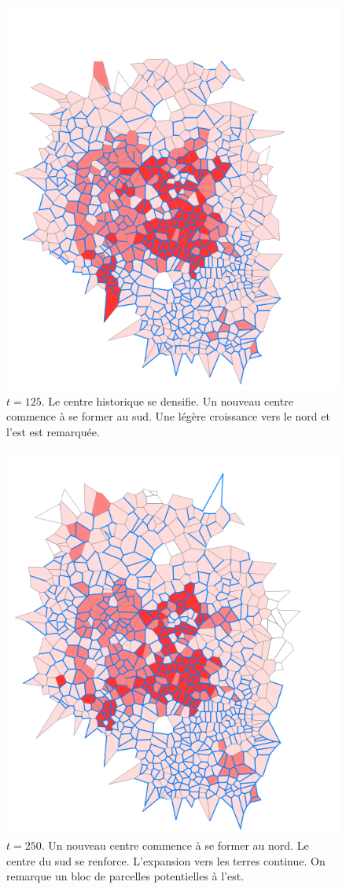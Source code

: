 \documentclass[10pt]{article}
\begin{document}
\begin{figure}[H]
  \centering
  \includegraphics[width=.8\linewidth]{images/lh_125.png}
  \caption{$t = 125$. Le centre historique se densifie. Un nouveau
    centre commence à se former au sud. Une légère croissance vers le
    nord et l'est est remarquée.}
    \label{fig:lh_125}
\end{figure}

\begin{figure}[H]
  \centering
  \includegraphics[width=.8\linewidth]{images/lh_250.png}
  \caption{$t = 250$. Un nouveau centre commence à se former au
    nord. Le centre du sud se renforce. L'expansion vers les terres
    continue. On remarque un bloc de parcelles potentielles à l'est.}
    \label{fig:lh_250}
\end{figure}
\end{document}
